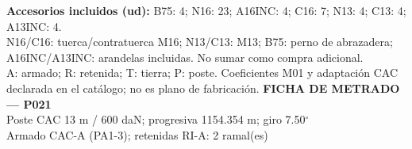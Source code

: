 \begingroup\scriptsize
\textbf{Accesorios incluidos (ud):} B75: 4; N16: 23; A16INC: 4; C16: 7; N13: 4; C13: 4; A13INC: 4.\\
N16/C16: tuerca/contratuerca M16; N13/C13: M13; B75: perno de abrazadera; A16INC/A13INC: arandelas incluidas. No sumar como compra adicional.\\
A: armado; R: retenida; T: tierra; P: poste. Coeficientes M01 y adaptación CAC declarada en el catálogo; no es plano de fabricación.
\endgroup\endgroup
\clearpage{}
\begingroup\small\setlength{\parskip}{3pt}\renewcommand{\arraystretch}{1.05}
\textbf{\large FICHA DE METRADO — P021}\\[4pt]
Poste CAC 13 m / 600 daN; progresiva 1154.354 m; giro 7.50\ensuremath{^\circ}\\
Armado CAC-A (PA1-3); retenidas RI-A: 2 ramal(es)\\
\begingroup\scriptsize
